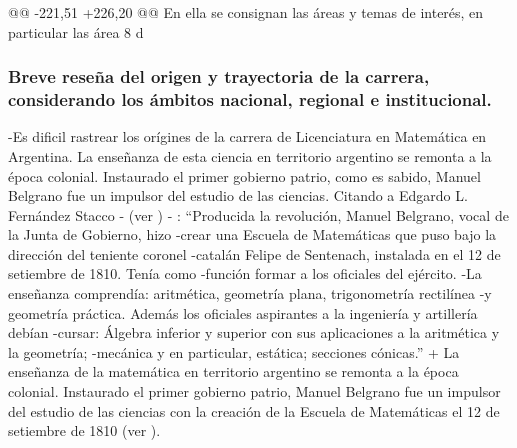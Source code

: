 @@ -221,51 +226,20 @@ En ella se consignan las áreas y temas de interés, en particular las área 8 d
 
 \subsubsection{Breve reseña del origen y trayectoria de la carrera, considerando los ámbitos nacional, regional e institucional.}
 
-Es dificil rastrear los orígines de la carrera de Licenciatura en Matemática en Argentina. La enseñanza de esta ciencia en territorio argentino se remonta a la  época colonial. Instaurado el primer gobierno patrio, como es sabido, Manuel Belgrano fue un impulsor del estudio de las ciencias. Citando a Edgardo L. Fernández Stacco
- (ver \cite{stacco2011200})
- : ``Producida la revolución, Manuel Belgrano, vocal de la Junta de Gobierno, hizo
-crear una Escuela de Matemáticas que puso bajo la dirección del teniente coronel
-catalán Felipe de Sentenach, instalada en el 12 de setiembre de 1810. Tenía como
-función formar a los oficiales del ejército.
-La enseñanza comprendía: aritmética, geometría plana, trigonometría rectilínea
-y geometría práctica. Además los oficiales aspirantes a la ingeniería y artillería debían
-cursar: Álgebra inferior y superior con sus aplicaciones a la aritmética y la geometría;
-mecánica y en particular, estática; secciones cónicas.''
+ La enseñanza de la matemática en territorio argentino se remonta a la  época colonial. Instaurado el primer gobierno patrio,  Manuel Belgrano fue un impulsor del estudio de las ciencias con  la creación de la   Escuela de Matemáticas  el 12 de setiembre de 1810 (ver \cite{stacco2011200}). 
 

